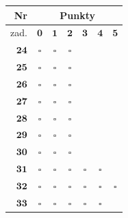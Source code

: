 \documentclass[10pt]{article}
\begin{document}
\begin{center}
\begin{tabular}{|r|c|c|c|c|c|c|}
\hline
Nr & \multicolumn{6}{|c|}{Punkty} \\
\hline
zad. & \(\mathbf{0}\) & \(\mathbf{1}\) & \(\mathbf{2}\) & \(\mathbf{3}\) & \(\mathbf{4}\) & \(\mathbf{5}\) \\
\hline
\(\mathbf{2 4}\) & \(\square\) & \(\square\) & \(\square\) &  &  &  \\
\hline
\(\mathbf{2 5}\) & \(\square\) & \(\square\) & \(\square\) &  &  &  \\
\hline
\(\mathbf{2 6}\) & \(\square\) & \(\square\) & \(\square\) &  &  &  \\
\hline
\(\mathbf{2 7}\) & \(\square\) & \(\square\) & \(\square\) &  &  &  \\
\hline
\(\mathbf{2 8}\) & \(\square\) & \(\square\) & \(\square\) &  &  &  \\
\hline
\(\mathbf{2 9}\) & \(\square\) & \(\square\) & \(\square\) &  &  &  \\
\hline
\(\mathbf{3 0}\) & \(\square\) & \(\square\) & \(\square\) &  &  &  \\
\hline
\(\mathbf{3 1}\) & \(\square\) & \(\square\) & \(\square\) & \(\square\) & \(\square\) &  \\
\hline
\(\mathbf{3 2}\) & \(\square\) & \(\square\) & \(\square\) & \(\square\) & \(\square\) & \(\square\) \\
\hline
\(\mathbf{3 3}\) & \(\square\) & \(\square\) & \(\square\) & \(\square\) & \(\square\) &  \\
\hline
\end{tabular}
\end{center}
\end{document}
